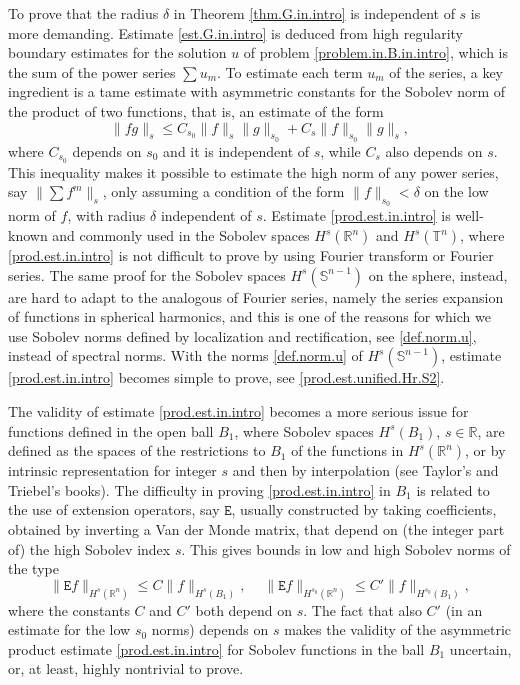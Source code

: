 \documentclass[10pt,reqno,a4paper]{article}
\numberwithin{equation}{section}
\theoremstyle{plain}
\theoremstyle{definition}
\newcommand{\R}{{\mathbb R}}
\newcommand{\T}{{\mathbb T}}
\renewcommand{\S}{{\mathbb S}}
\begin{document}
To prove that the radius $\delta$ in Theorem \ref{thm.G.in.intro} 
is independent of $s$ is more demanding. 
Estimate \eqref{est.G.in.intro} is deduced from high regularity boundary estimates 
for the solution $u$ of problem \eqref{problem.in.B.in.intro}, 
which is the sum of the power series $\sum u_m$. 
To estimate each term $u_m$ of the series, a key ingredient is 
a tame estimate with asymmetric constants for the Sobolev norm 
of the product of two functions, 
that is, an estimate of the form 
\begin{equation} \label{prod.est.in.intro}
\| fg \|_s
\leq C_{s_0} \| f \|_s \| g \|_{s_0} + C_s \| f \|_{s_0} \| g \|_s,
\end{equation}
where $C_{s_0}$ depends on $s_0$ and it is independent of $s$, 
while $C_s$ also depends on $s$. 
This inequality makes it possible to estimate 
the high norm of any power series, say $\| \sum f^m \|_s$, 
only assuming a condition of the form $\| f \|_{s_0} < \delta$ 
on the low norm of $f$, with radius $\delta$ independent of $s$.
Estimate \eqref{prod.est.in.intro} is well-known and commonly used 
in the Sobolev spaces $H^s(\R^n)$ and $H^s(\T^n)$,  
where \eqref{prod.est.in.intro} is not difficult to prove 
by using Fourier transform or Fourier series. 
The same proof for the Sobolev spaces $H^s(\S^{n-1})$ on the sphere, 
instead, are hard to adapt to the analogous of Fourier series, 
namely the series expansion of functions in spherical harmonics, 
and this is one of the reasons for which we use 
Sobolev norms defined by localization and rectification, 
see \eqref{def.norm.u}, instead of spectral norms. 
With the norms \eqref{def.norm.u} of $H^s(\S^{n-1})$, 
estimate \eqref{prod.est.in.intro} becomes simple to prove, 
see \eqref{prod.est.unified.Hr.S2}. 

The validity of estimate \eqref{prod.est.in.intro} 
becomes a more serious issue for functions defined in the open ball $B_1$, 
where Sobolev spaces $H^s(B_1)$, $s \in \R$, 
are defined as the spaces of the restrictions to $B_1$ 
of the functions in $H^s(\R^n)$, or by intrinsic representation for integer $s$ 
and then by interpolation (see Taylor's \cite{Taylor.volume.3} 
and Triebel's \cite{Triebel.1983} books).    
The difficulty in proving \eqref{prod.est.in.intro} in $B_1$ 
is related to the use of extension operators, 
say $\mathtt E$, usually constructed by taking coefficients, 
obtained by inverting a Van der Monde matrix, 
that depend on (the integer part of) the high Sobolev index $s$. 
This gives bounds in low and high Sobolev norms of the type 
\[
\| \mathtt{E} f \|_{H^s(\R^n)} \leq C \| f \|_{H^s(B_1)}, \quad \ 
\| \mathtt{E} f \|_{H^{s_0}(\R^n)} \leq C' \| f \|_{H^{s_0}(B_1)}, 
\]
where the constants $C$ and $C'$ both depend on $s$. 
The fact that also $C'$ (in an estimate for the low $s_0$ norms) 
depends on $s$ makes the validity of the asymmetric product estimate \eqref{prod.est.in.intro}
for Sobolev functions in the ball $B_1$ uncertain, or, at least, highly nontrivial to prove. 
\end{document}
